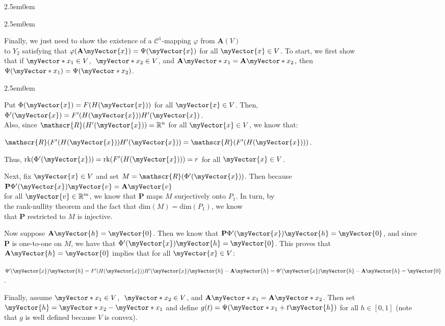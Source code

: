 \documentclass{book}
\newcommand{\hFour}{%
   \color{Cerulean}
   \fontsize{12}{14}\selectfont%
}
\newenvironment{myIndent}{%
   \begin{adjustwidth}{2.5em}{0em}%
}{%
   \end{adjustwidth}%
}
\newcommand{\myDim}[1]{\mathrm{dim}(#1)}
\newcommand{\rank}[1]{\mathrm{rk}(#1)}
\newcommand{\rangeSp}[1]{\mathscr{R}(#1)}
\newcommand{\retTwo}{\hfill\bigbreak}
\newcommand{\mVec}[1]{\myVector{#1}}
\newcommand{\mVecAst}[1]{\myVector*{#1}}
\newcommand{\mMat}[1]{\mathbf{#1}}
\begin{document}
{\begin{myIndent}
{\begin{myIndent}
      Finally, we just need to show the existence of a $\mathscr{C}^1$-mapping $\varphi$ from $\mMat{A}(V)$\\ to $Y_2$ satisfying that $\varphi(\mMat{A}\mVec{x}) = \Psi(\mVec{x})$ for all $\mVec{x} \in V$. To start, we first show\\ that if $\mVecAst{x}_1 \in V$, $\hspace{0.3em}\mVecAst{x}_2 \in V$, and $\mMat{A}\mVecAst{x}_1 = \mMat{A}\mVecAst{x}_2$, then $\Psi(\mVecAst{x}_1) = \Psi(\mVecAst{x}_2)$.
      {\begin{myIndent}\hFour
         Put $\Phi(\mVec{x}) = F(H(\mVec{x}))$ for all $\mVec{x} \in V$. Then, $\Phi^\prime(\mVec{x}) = F^\prime(H(\mVec{x}))H^\prime(\mVec{x})$.\\ Also, since $\rangeSp{H^\prime(\mVec{x})} = \mathbb{R}^n$ for all $\mVec{x} \in V$, we know that: 
         
         {\centering$\rangeSp{F^\prime(H(\mVec{x}))H^\prime(\mVec{x})} = \rangeSp{F^\prime(H(\mVec{x}))}$.\retTwo\par}
         
         Thus, $\rank{\Phi^\prime(\mVec{x})} = \rank{F^\prime(H(\mVec{x}))} = r$  for all $\mVec{x} \in V$.\retTwo

         Next, fix $\mVec{x} \in V$ and set $M = \rangeSp{\Phi^\prime(\mVec{x})}$. Then because $\mMat{P}\Phi^\prime(\mVec{x})\mVec{v} = \mMat{A}\mVec{v}$\\ for all $\mVec{v} \in \mathbb{R}^m$, we know that $\mMat{P}$ maps $M$ surjectively onto $P_1$. In turn, by\\ the rank-nullity theorem and the fact that $\myDim{M} = \myDim{P_1}$, we know\\ that $\mMat{P}$ restricted to $M$ is injective.\retTwo

         Now suppose $\mMat{A}\mVec{h} = \mVec{0}$. Then we know that $\mMat{P}\Phi^\prime(\mVec{x})\mVec{h} = \mVec{0}$, and since\\ [-2pt]  $\mMat{P}$ is one-to-one on $M$, we have that $\Phi^\prime(\mVec{x})\mVec{h} = \mVec{0}$. This proves that\\ [-2pt]  $\mMat{A}\mVec{h} = \mVec{0}$ implies that for all $\mVec{x} \in V$:
         
         {\centering $\Psi^\prime(\mVec{x})\mVec{h} = F^\prime(H(\mVec{x}))H^\prime(\mVec{x})\mVec{h} - \mMat{A}\mVec{h} = \Phi^\prime(\mVec{x})\mVec{h} - \mMat{A}\mVec{h} = \mVec{0}$. \retTwo\par}

         Finally, assume $\mVecAst{x}_1 \in V$, $\hspace{0.3em}\mVecAst{x}_2 \in V$, and $\mMat{A}\mVecAst{x}_1 = \mMat{A}\mVecAst{x}_2$. Then set\\ $\mVec{h} = \mVecAst{x}_2  - \mVecAst{x}_1$ and define $g(t) = \Psi(\mVecAst{x}_1 + t\mVec{h})$ for all $h \in [0, 1]$ (note\\ that $g$ is well defined because $V$ is convex).\retTwo


\end{myIndent}}
\end{myIndent}}
\end{myIndent}}
\end{document}
